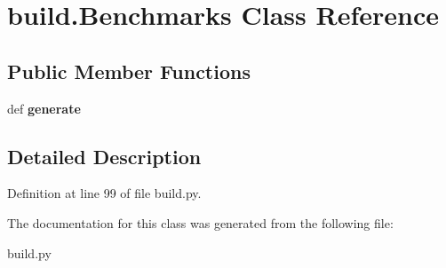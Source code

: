 \hypertarget{classbuild_1_1Benchmarks}{\section{build.\-Benchmarks \-Class \-Reference}
\label{classbuild_1_1Benchmarks}
}
\subsection*{\-Public \-Member \-Functions}
\begin{DoxyCompactItemize}
\item 
\hypertarget{classbuild_1_1Benchmarks_a90444b5ee86805be3194ec86e41ee0a9}{def {\bfseries generate}}\label{classbuild_1_1Benchmarks_a90444b5ee86805be3194ec86e41ee0a9}

\end{DoxyCompactItemize}


\subsection{\-Detailed \-Description}


\-Definition at line 99 of file build.\-py.



\-The documentation for this class was generated from the following file\-:\begin{DoxyCompactItemize}
\item 
build.\-py\end{DoxyCompactItemize}
